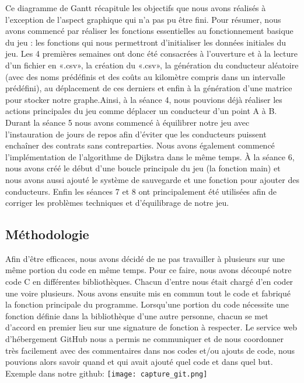 \documentclass[a4paper, 12pt]{article}
\begin{document}
    Ce diagramme de Gantt récapitule les objectifs que nous avons réalisés à l’exception de l’aspect graphique qui n’a pas pu être fini. Pour résumer, nous avons commencé par réaliser les
    fonctions essentielles au fonctionnement basique du jeu : les fonctions qui nous permettront d’initialiser les données initiales du jeu. 
    \newpage
    Les 4 premières semaines ont donc été consacrées à l’ouverture et à la lecture d’un fichier en «.csv», la création du «.csv», la génération du conducteur aléatoire (avec des noms prédéfinis et des coûts au kilomètre compris dans un intervalle prédéfini), au déplacement de ces derniers et enfin à la génération d'une matrice pour stocker notre graphe.Ainsi, à la séance 4, nous pouvions déjà réaliser les actions principales du jeu comme déplacer un conducteur d’un point A à B.\newline
    Durant la séance 5 nous avons commencé à équilibrer notre jeu avec l’instauration de jours de repos afin d’éviter que les conducteurs puissent enchaîner des contrats sans contreparties. Nous avons également commencé l'implémentation de l'algorithme de Dijkstra dans le même temps.\newline
    À la séance 6, nous avons créé le début d'une boucle principale du jeu (la fonction main) et nous avons aussi ajouté le système de sauvegarde et une fonction pour ajouter des conducteurs. Enfin les séances 7 et 8 ont principalement été utilisées afin de corriger les problèmes techniques et d'équilibrage de notre jeu.
        
        
        
\subsection{Méthodologie}
Afin d'être efficaces, nous avons décidé de ne pas travailler à plusieurs sur une même portion du code en même temps. Pour ce faire, nous avons découpé notre code C en différentes bibliothèques. Chacun d'entre nous était chargé d'en coder une voire plusieurs.
Nous avons ensuite mis en commun tout le code et fabriqué la fonction principale du programme.
\newline
Lorsqu'une portion du code nécessite une fonction définie dans la bibliothèque d'une autre personne, chacun se met d'accord en premier lieu sur une signature de fonction à respecter. Le service web d'hébergement GitHub nous a permis ne communiquer et de nous coordonner très facilement avec des commentaires dans nos codes et/ou ajouts de code, nous pouvions alors savoir quand et qui avait ajouté quel code et dans quel but.\newline \newline 
Exemple dans notre github:\newline
\texttt{[image: capture\_git.png]}
\newpage
\end{document}
